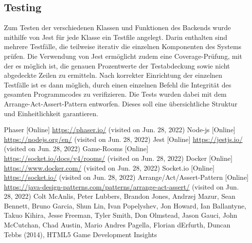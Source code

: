 \documentclass[conference]{IEEEtran}
\begin{document}
\subsection{Testing}
Zum Testen der verschiedenen Klassen und Funktionen des Backends wurde mithilfe von Jest für jede Klasse ein Testfile angelegt. Darin enthalten sind mehrere Testfälle, die teilweise iterativ die einzelnen Komponenten des Systems prüfen. Die Verwendung von Jest\cite{jest} ermöglicht zudem eine Coverage-Prüfung, mit der es möglich ist, die genauen Prozentwerte der Testabdeckung sowie nicht abgedeckte Zeilen zu ermitteln. Nach korrekter Einrichtung der einzelnen Testfälle ist es dann möglich, durch einen einzelnen Befehl die Integrität des gesamten Programmcodes zu verifizieren. Die Tests wurden dabei mit dem Arrange-Act-Assert-Pattern\cite{aaa} entworfen. Dieses soll eine übersichtliche Struktur und Einheitlichkeit garantieren.

\begin{thebibliography}{0}
	Phaser [Online] \url{https://phaser.io/} (visited on Jun. 28, 2022)
    Node-js [Online] \url{https://nodejs.org/en/} (visited on Jun. 28, 2022)
    Jest [Online] \url{https://jestjs.io/} (visited on Jun. 28, 2022)
    Game-Rooms [Online] \url{https://socket.io/docs/v4/rooms/} (visited on Jun. 28, 2022)
    Docker [Online] \url{https://www.docker.com/} (visited on Jun. 28, 2022)
    Socket.io [Online] \url{https://socket.io/} (visited on Jun. 28, 2022)
    Arrange/Act/Assert-Pattern [Online] \url{https://java-design-patterns.com/patterns/arrange-act-assert/} (visited on Jun. 28, 2022)
     Colt McAnlis, Peter Lubbers, Brandon Jones, Andrzej Mazur, Sean Bennett, Bruno Garcia, Shun Lin, Ivan Popelyshev, Jon Howard, Ian Ballantyne, Takuo Kihira, Jesse Freeman, Tyler Smith, Don Olmstead, Jason Gauci, John McCutchan, Chad Austin, Mario Andres Pagella, Florian dErfurth, Duncan Tebbs (2014), HTML5 Game Development Insights
\end{thebibliography}
\end{document}
